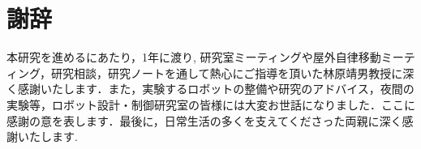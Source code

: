 \chapter*{謝辞}

本研究を進めるにあたり，1年に渡り, 研究室ミーティングや屋外自律移動ミーティング，研究相談，研究ノートを通して熱心にご指導を頂いた林原靖男教授に深く感謝いたします．また，実験するロボットの整備や研究のアドバイス，夜間の実験等，ロボット設計・制御研究室の皆様には大変お世話になりました．ここに感謝の意を表します．最後に，日常生活の多くを支えてくださった両親に深く感謝いたします.
%

